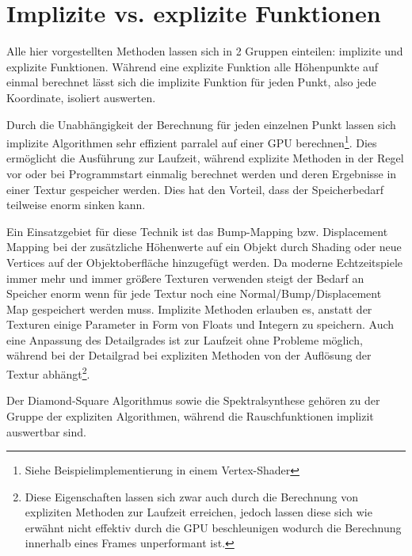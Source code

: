 \section{Implizite vs. explizite Funktionen}
Alle hier vorgestellten Methoden lassen sich in 2 Gruppen einteilen: implizite und explizite Funktionen.
Während eine explizite Funktion alle Höhenpunkte auf einmal berechnet lässt sich die implizite Funktion für jeden Punkt, also jede Koordinate, isoliert auswerten. 

Durch die Unabhängigkeit der Berechnung für jeden einzelnen Punkt lassen sich implizite Algorithmen sehr effizient parralel auf einer GPU berechnen\footnote{Siehe Beispielimplementierung in einem Vertex-Shader}. Dies ermöglicht die Ausführung zur Laufzeit, während explizite Methoden in der Regel vor oder bei Programmstart einmalig berechnet werden und deren Ergebnisse in einer Textur gespeicher werden.
Dies hat den Vorteil, dass der Speicherbedarf teilweise enorm sinken kann. 

Ein Einsatzgebiet für diese Technik ist das Bump-Mapping bzw. Displacement Mapping bei der zusätzliche Höhenwerte auf ein Objekt durch Shading oder neue Vertices auf der Objektoberfläche hinzugefügt werden\cite{displacementNStuff}. Da moderne Echtzeitspiele immer mehr und immer größere Texturen verwenden steigt der Bedarf an Speicher enorm wenn für jede Textur noch eine Normal/Bump/Displacement Map gespeichert werden muss. Implizite Methoden erlauben es, anstatt der Texturen einige Parameter in Form von Floats und Integern zu speichern.
Auch eine Anpassung des Detailgrades ist zur Laufzeit ohne Probleme möglich, während bei der Detailgrad bei expliziten Methoden von der Auflösung der Textur abhängt\footnote{Diese Eigenschaften lassen sich zwar auch durch die Berechnung von expliziten Methoden zur Laufzeit erreichen, jedoch lassen diese sich wie erwähnt nicht effektiv durch die GPU beschleunigen wodurch die Berechnung innerhalb eines Frames unperformant ist.}.

Der Diamond-Square Algorithmus sowie die Spektralsynthese gehören zu der Gruppe der expliziten Algorithmen, während die Rauschfunktionen implizit auswertbar sind.